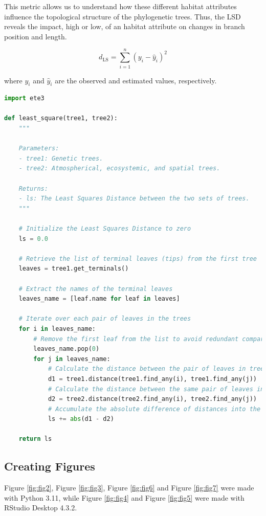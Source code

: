 This metric allows us to understand how these different habitat attributes influence the topological structure of the phylogenetic trees. Thus, the LSD reveals the impact, high or low, of an habitat attribute on changes in branch position and length.

\begin{equation}\label{eq:ls}
    d_{\text{LS}} = \sum_{i=1}^{n} (y_i - \hat{y}_i)^2
\end{equation}

where $y_i$ and $\hat{y}_i$ are the observed and estimated values, respectively.

\begin{lstlisting}[label=lst:LeastSquare, language=Python, caption=Python script for calculating the LSD using the ete3 package in the aPhyloGeo package]
import ete3

def least_square(tree1, tree2):
    """
    
    Parameters:
    - tree1: Genetic trees.
    - tree2: Atmospherical, ecosystemic, and spatial trees.

    Returns:
    - ls: The Least Squares Distance between the two sets of trees.
    """
    
    # Initialize the Least Squares Distance to zero
    ls = 0.0
    
    # Retrieve the list of terminal leaves (tips) from the first tree
    leaves = tree1.get_terminals()
    
    # Extract the names of the terminal leaves
    leaves_name = [leaf.name for leaf in leaves]
    
    # Iterate over each pair of leaves in the trees
    for i in leaves_name:
        # Remove the first leaf from the list to avoid redundant comparisons
        leaves_name.pop(0)
        for j in leaves_name:
            # Calculate the distance between the pair of leaves in tree1
            d1 = tree1.distance(tree1.find_any(i), tree1.find_any(j))
            # Calculate the distance between the same pair of leaves in tree2
            d2 = tree2.distance(tree2.find_any(i), tree2.find_any(j))
            # Accumulate the absolute difference of distances into the LSD
            ls += abs(d1 - d2)
    
    return ls
\end{lstlisting}

\subsection{Creating Figures}\label{Figures}
Figure \ref{fig:fig2}, Figure \ref{fig:fig3}, Figure \ref{fig:fig6} and Figure \ref{fig:fig7} were made with Python 3.11, while Figure \ref{fig:fig4} and Figure \ref{fig:fig5} were made with RStudio Desktop 4.3.2.


